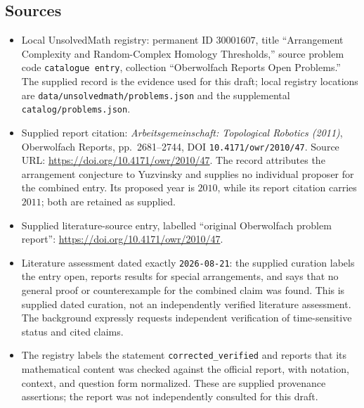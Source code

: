 \documentclass[11pt]{article}
\begin{document}
\subsection{Sources}
\begin{itemize}
\item Local UnsolvedMath registry: permanent ID \(30001607\), title ``Arrangement Complexity and Random-Complex Homology Thresholds,'' source problem code \texttt{catalogue entry}, collection ``Oberwolfach Reports Open Problems.'' The supplied record is the evidence used for this draft; local registry locations are \texttt{data/unsolvedmath/problems.json} and the supplemental \texttt{catalog/problems.json}.
\item Supplied report citation: \emph{Arbeitsgemeinschaft: Topological Robotics (2011)}, Oberwolfach Reports, pp.~2681--2744, DOI \texttt{10.4171/owr/2010/47}. Source URL: \url{https://doi.org/10.4171/owr/2010/47}. The record attributes the arrangement conjecture to Yuzvinsky and supplies no individual proposer for the combined entry. Its proposed year is \(2010\), while its report citation carries \(2011\); both are retained as supplied.
\item Supplied literature-source entry, labelled ``original Oberwolfach problem report'': \url{https://doi.org/10.4171/owr/2010/47}.
\item Literature assessment dated exactly \texttt{2026-08-21}: the supplied curation labels the entry open, reports results for special arrangements, and says that no general proof or counterexample for the combined claim was found. This is supplied dated curation, not an independently verified literature assessment. The background expressly requests independent verification of time-sensitive status and cited claims.
\item The registry labels the statement \texttt{corrected\_verified} and reports that its mathematical content was checked against the official report, with notation, context, and question form normalized. These are supplied provenance assertions; the report was not independently consulted for this draft.
\end{itemize}
\end{document}
